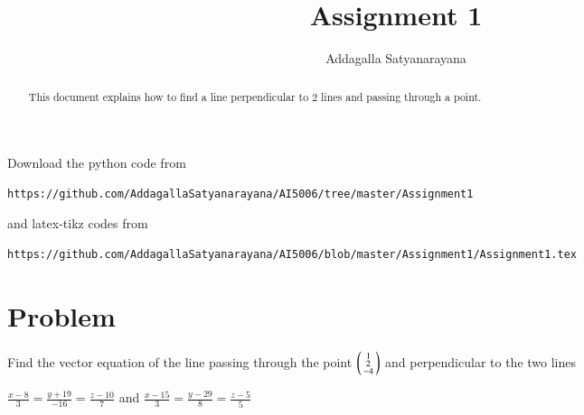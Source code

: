 \documentclass[journal,12pt,twocolumn]{IEEEtran}
\begin{document}
\renewcommand{\thefigure}{\theproblem}
\def\putbox#1#2#3{\makebox[0in][l]{\makebox[#1][l]{}\raisebox{\baselineskip}[0in][0in]{\raisebox{#2}[0in][0in]{#3}}}}
     \def\rightbox#1{\makebox[0in][r]{#1}}
     \def\centbox#1{\makebox[0in]{#1}}
     \def\topbox#1{\raisebox{-\baselineskip}[0in][0in]{#1}}
     \def\midbox#1{\raisebox{-0.5\baselineskip}[0in][0in]{#1}}
\vspace{3cm}
\title{Assignment 1}
\author{Addagalla Satyanarayana}
\maketitle
\newpage
\bigskip
\renewcommand{\thefigure}{\theenumi}
\renewcommand{\thetable}{\theenumi}
\begin{abstract}
This document explains how to find a line perpendicular to 2 lines and passing through a point.
\end{abstract}
Download the python code from 
%
\begin{lstlisting}
https://github.com/AddagallaSatyanarayana/AI5006/tree/master/Assignment1
\end{lstlisting}
%
and latex-tikz codes from 
%
\begin{lstlisting}
https://github.com/AddagallaSatyanarayana/AI5006/blob/master/Assignment1/Assignment1.tex
\end{lstlisting}
%
\section{Problem}
\begin{flushleft}
	Find the vector equation of the line passing through the point $\begin{psmallmatrix}1 \\2 \\-4	\end{psmallmatrix}$
	and perpendicular to the two lines
\end{flushleft}
\begin{flushleft}
	$\frac{x-8}{3} = \frac{y+19}{-16}= \frac{z-10}{7} $ and
	$\frac{x-15}{3} = \frac{y-29}{8}= \frac{z-5}{5} $
\end{flushleft}
\end{document}

